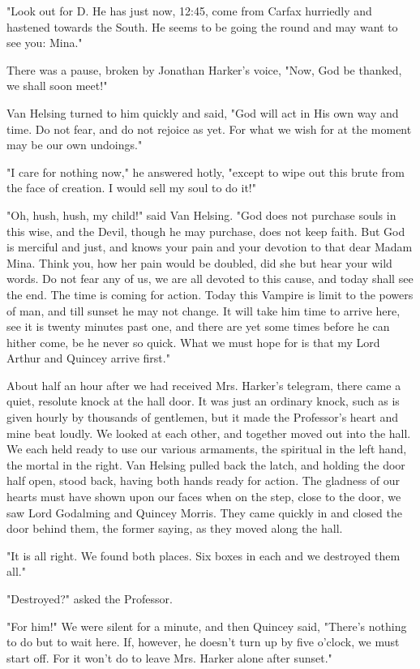 "Look out for D. He has just now, 12:45, come from Carfax hurriedly and hastened towards the South. He seems to be going the round and may want to see you: Mina." 

There was a pause, broken by Jonathan Harker's voice, "Now, God be thanked, we shall soon meet!" 

Van Helsing turned to him quickly and said, "God will act in His own way and time. Do not fear, and do not rejoice as yet. For what we wish for at the moment may be our own undoings." 

"I care for nothing now," he answered hotly, "except to wipe out this brute from the face of creation. I would sell my soul to do it!" 

"Oh, hush, hush, my child!" said Van Helsing. "God does not purchase souls in this wise, and the Devil, though he may purchase, does not keep faith. But God is merciful and just, and knows your pain and your devotion to that dear Madam Mina. Think you, how her pain would be doubled, did she but hear your wild words. Do not fear any of us, we are all devoted to this cause, and today shall see the end. The time is coming for action. Today this Vampire is limit to the powers of man, and till sunset he may not change. It will take him time to arrive here, see it is twenty minutes past one, and there are yet some times before he can hither come, be he never so quick. What we must hope for is that my Lord Arthur and Quincey arrive first." 

About half an hour after we had received Mrs. Harker's telegram, there came a quiet, resolute knock at the hall door. It was just an ordinary knock, such as is given hourly by thousands of gentlemen, but it made the Professor's heart and mine beat loudly. We looked at each other, and together moved out into the hall. We each held ready to use our various armaments, the spiritual in the left hand, the mortal in the right. Van Helsing pulled back the latch, and holding the door half open, stood back, having both hands ready for action. The gladness of our hearts must have shown upon our faces when on the step, close to the door, we saw Lord Godalming and Quincey Morris. They came quickly in and closed the door behind them, the former saying, as they moved along the hall. 

"It is all right. We found both places. Six boxes in each and we destroyed them all." 

"Destroyed?" asked the Professor. 

"For him!" We were silent for a minute, and then Quincey said, "There's nothing to do but to wait here. If, however, he doesn't turn up by five o'clock, we must start off. For it won't do to leave Mrs. Harker alone after sunset." 

